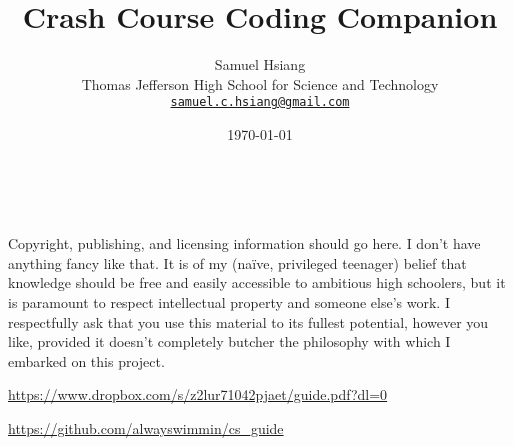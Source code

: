 \title{Crash Course Coding Companion}
\author{Samuel Hsiang \\ Thomas Jefferson High School for Science and Technology \\ \href{mailto:samuel.c.hsiang@gmail.com}{\texttt{\textup{samuel.c.hsiang@gmail.com}}} }
\date{\today}

\maketitle

\newpage
~\vfill
\thispagestyle{empty}


\noindent Copyright, publishing, and licensing information should go here. I don't have anything fancy like that. It is of my (na\"{i}ve, privileged teenager) belief that knowledge should be free and easily accessible to ambitious high schoolers, but it is paramount to respect intellectual property and someone else's work. I respectfully ask that you use this material to its fullest potential, however you like, provided it doesn't completely butcher the philosophy with which I embarked on this project.



\noindent \url{https://www.dropbox.com/s/z2lur71042pjaet/guide.pdf?dl=0}

\noindent \url{https://github.com/alwayswimmin/cs_guide}



\newpage
\thispagestyle{empty}
\par\vspace*{.35\textheight}{\centering For Rachel \par}

